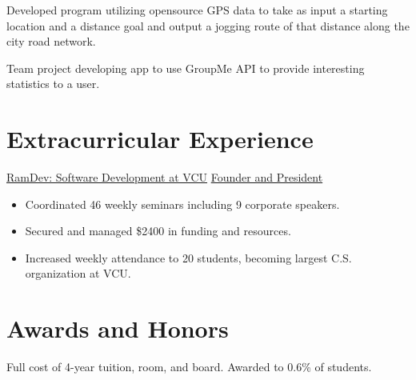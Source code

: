 \documentclass[11pt,letterpaper,serif]{moderncv}
\begin{document}
{
	\begin{adjustwidth}{.25in}{}
		Developed program utilizing opensource GPS data to take as input a starting location and a distance goal and output a jogging route of that distance along the city road network.
	\end{adjustwidth}
}

{
	\begin{adjustwidth}{.25in}{}
		Team project developing app to use GroupMe API to provide interesting statistics to a user.
	\end{adjustwidth}
}


\section{Extracurricular Experience}
{\href{https://vcuramdev.github.io/}{RamDev: Software Development at VCU}}
{\href{https://vcuramdev.github.io/}{Founder and President}}
{}{}
{
	\begin{adjustwidth}{.25in}{}
		\begin{itemize}
			\item Coordinated 46 weekly seminars including 9 corporate speakers.
			\item Secured and managed \$2400 in funding and resources.
			\item Increased weekly attendance to 20 students, becoming largest C.S. organization at VCU.
		\end{itemize}
	\end{adjustwidth}
}


\section{Awards and Honors}
{	
	\begin{adjustwidth}{.25in}{}
		Full cost of 4-year tuition, room, and board. \newline
		Awarded to 0.6\% of students. 
	\end{adjustwidth}
}
\end{document}
